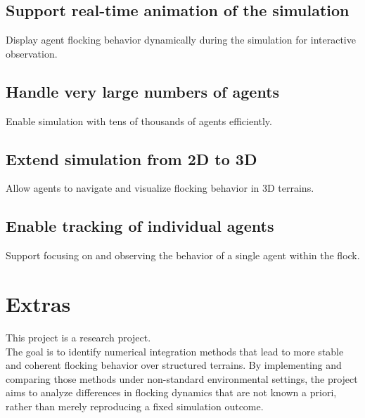 \documentclass{article}
\begin{document}
\subsection{Support real-time animation of the simulation}
Display agent flocking behavior dynamically during the simulation for interactive observation.

\subsection{Handle very large numbers of agents}
Enable simulation with tens of thousands of agents efficiently.

\subsection{Extend simulation from 2D to 3D}
Allow agents to navigate and visualize flocking behavior in 3D terrains.

\subsection{Enable tracking of individual agents}
Support focusing on and observing the behavior of a single agent within the flock.


\section{Extras}

This project is a research project. \\
The goal is to identify numerical integration methods that lead to more stable and coherent flocking behavior over 
structured terrains. By implementing and comparing those methods under non-standard environmental settings, the project 
aims to analyze differences in flocking dynamics that are not known a priori, rather than merely reproducing a fixed 
simulation outcome.
\end{document}
